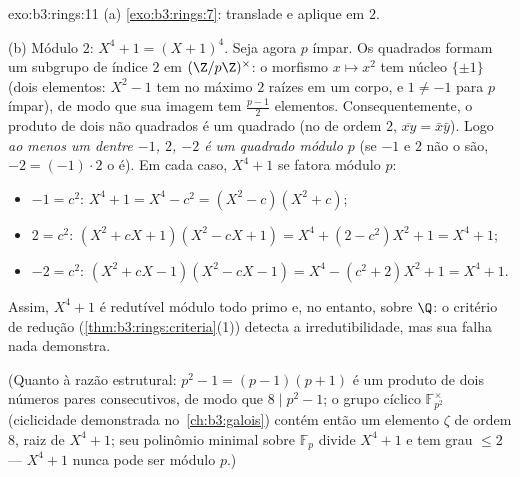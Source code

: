 \begin{solution}{exo:b3:rings:11}
(a) \cref{exo:b3:rings:7}: translade e aplique  em $2$.

(b) Módulo $2$: $X^4 + 1 = (X + 1)^4$. Seja agora $p$ ímpar. Os quadrados formam
um subgrupo de índice $2$ em $(\Z/p\Z)^\times$: o morfismo $x \mapsto x^2$ tem núcleo
$\{\pm 1\}$ (dois elementos: $X^2
- 1$ tem no máximo $2$ raízes em um corpo, e
$1 \neq -1$ para $p$ ímpar), de modo que sua imagem tem $\frac{p-1}2$ elementos.
Consequentemente, o produto de dois não quadrados é um quadrado (no
 de ordem $2$, $\overline{xy} = \bar x\bar y$). Logo \emph{ao menos um dentre
$-1$, $2$, $-2$ é um quadrado módulo $p$} (se $-1$ e
$2$ não o são, $-2 = (-1)\cdot 2$ o é). Em cada caso, $X^4 + 1$ se fatora módulo
$p$:
\begin{itemize}
  \item $-1 = c^2$: \quad $X^4 + 1 = X^4 - c^2 = (X^2 - c)(X^2 +
        c)$;
  \item $2 = c^2$: \quad $(X^2 + cX + 1)(X^2 - cX + 1) = X^4 + (2
        - c^2)X^2 + 1 = X^4 + 1$;
  \item $-2 = c^2$: \quad $(X^2 + cX - 1)(X^2 - cX - 1) = X^4 -
        (c^2 + 2)X^2 + 1 = X^4 + 1$.
\end{itemize}
Assim, $X^4+1$ é redutível módulo todo primo e, no entanto,
 sobre $\Q$: o critério de redução (\cref{thm:b3:rings:criteria}(1))
detecta a irredutibilidade, mas sua falha nada demonstra.

(Quanto à razão estrutural: $p^2 - 1 = (p-1)(p+1)$ é um produto de dois números pares
consecutivos, de modo que $8 \mid p^2 - 1$; o grupo cíclico $\mathbb F_{p^2}^\times$ (ciclicidade
demonstrada no~\cref{ch:b3:galois}) contém então um elemento $\zeta$ de
ordem $8$, raiz de $X^4 + 1$; seu polinômio minimal sobre $\mathbb
F_p$ divide
$X^4+1$ e tem grau $\leq 2$ --- $X^4+1$ nunca pode ser
 módulo $p$.)
\end{solution}

